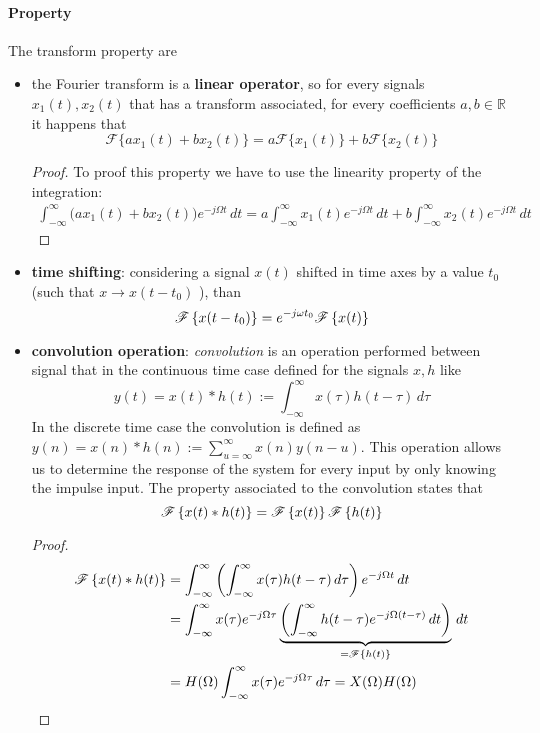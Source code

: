 	\paragraph{Property} The transform property are
	\begin{itemize}
		\item the Fourier transform is a \textbf{linear operator}, so for every signals $x_1(t),x_2(t)$ that has a transform associated, for every coefficients $a,b\in \mathds R$ it happens that
		\[ \mathscr{F} \big\{ a x_1(t) + b x_2(t) \big\} = a \mathscr{F}\big\{x_1(t)\big\} + b \mathscr{F}\big\{x_2(t)\big\}\]
		\begin{proof}
			To proof this property we have to use the linearity property of the integration:
			\begin{align*}
				\int_{-\infty}^\infty \Big(a x_1 (t) + bx_2(t)\Big) e ^{-j\Omega t} \, dt = a \int_{-\infty}^\infty x_1 (t)  e ^{-j\Omega t} \, dt + b \int_{-\infty}^\infty x_2 (t)  e ^{-j\Omega t} \, dt 
			\end{align*}
		\end{proof}
		
		\item \textbf{time shifting}: considering a signal $x(t)$ shifted in time axes by a value $t_0$ (such that $x \rightarrow x(t-t_0)$ ), than
		\[ \mathscr{F}\left\{ x(t-t_0) \right\} = e^{-j\omega t_0} \mathscr{F}\left\{ x(t) \right\} \]
		
		\item \textbf{convolution operation}: \textit{convolution} is an operation performed between signal that in the continuous time case defined for the signals $x,h$ like
		\[y(t) = x(t) * h(t) := \int_{-\infty}^\infty x(\tau) h(t-\tau)\, d\tau \]
		In the discrete time case the convolution is defined as $y(n) = x(n)*h(n) := \sum_{u=\infty}^\infty x(n) y(n-u)$. This operation allows us to determine the response of the system for every input by only knowing the impulse input. The property associated to the convolution states that
		\[ \mathscr{F}\left\{ x(t) * h(t) \right\} = \mathscr{F}\left\{ x(t) \right\} \mathscr{F}\left\{ h(t) \right\} \]
		\begin{proof}
			\begin{align*}
				\mathscr{F}\left\{ x(t) * h(t) \right\} & = \int_{-\infty}^\infty \left( \int_{-\infty}^\infty x(\tau) h(t-\tau)\, d\tau \right) e^{-j\Omega t} \, dt \\
				& =  \int_{-\infty}^\infty x(\tau) e^{-j\Omega \tau} \underbrace{\left( \int_{-\infty}^\infty h(t-\tau) e^{-j\Omega(t-\tau)} \, dt \right)}_{=\mathscr{F}\left\{ h(t) \right\}} \, dt \\
				& = H(\Omega) \int_{-\infty}^\infty x(\tau) e^{-j\Omega \tau} \, d\tau = X(\Omega) H(\Omega)
			\end{align*}
		\end{proof}
	

\end{itemize}
